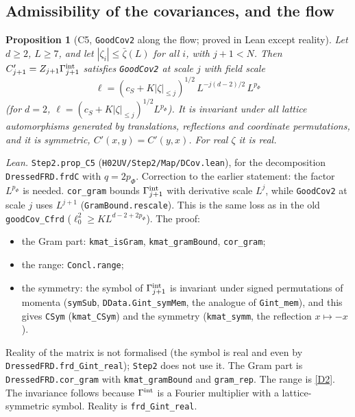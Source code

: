 \documentclass[11pt]{amsart}
\newtheorem{proposition}[theorem]{Proposition}
\theoremstyle{definition}
\theoremstyle{remark}
\numberwithin{equation}{section}
\begin{document}
\subsection{Admissibility of the covariances, and the flow}
\label{sec:coupling-flow}
\begin{proposition}[C5, \texttt{GoodCov2} along the flow; proved in Lean except reality]\label{prop:C5}
Let $d\ge2$, $L\ge7$, and let $|\zeta_i|\le\bar\zeta(L)$ for all $i$, with $j+1<N$. Then
$C'_{j+1}=Z_{j+1}\Gamma^{\rm int}_{j+1}$ satisfies \texttt{GoodCov2} at scale $j$ with field scale
\[
  \ell=(c_S+K|\zeta|_{\le j})^{1/2}\,L^{-j(d-2)/2}\,L^{p_\Phi}
\]
(for $d=2$, $\ell=(c_S+K|\zeta|_{\le j})^{1/2}L^{p_\Phi}$). It is invariant under all lattice
automorphisms generated by translations, reflections and coordinate permutations, and it is
symmetric, $C'(x,y)=C'(y,x)$. For real $\zeta$ it is real.
\end{proposition}
\noindent\emph{Lean.} \texttt{Step2.prop\_C5} (\texttt{H02UV/Step2/Map/DCov.lean}), for the decomposition
\texttt{DressedFRD.frdC} with $q=2p_\Phi$. Correction to the earlier statement: the factor
$L^{p_\Phi}$ is needed. \texttt{cor\_gram} bounds $\Gamma^{\rm int}_{j+1}$ with derivative scale
$L^j$, while \texttt{GoodCov2} at scale $j$ uses $L^{j+1}$ (\texttt{GramBound.rescale}). This is the
same loss as in the old \texttt{goodCov\_Cfrd} ($\ell_0^2\ge KL^{d-2+2p_\Phi}$). The proof:
\begin{itemize}
\item the Gram part: \texttt{kmat\_isGram}, \texttt{kmat\_gramBound}, \texttt{cor\_gram};
\item the range: \texttt{Concl.range};
\item the symmetry: the symbol of $\Gamma^{\rm int}_{j+1}$ is invariant under signed permutations of
  momenta (\texttt{symSub}, \texttt{DData.Gint\_symMem}, the analogue of \texttt{Gint\_mem}), and
  this gives \texttt{CSym} (\texttt{kmat\_CSym}) and the symmetry (\texttt{kmat\_symm}, the
  reflection $x\mapsto-x$).
\end{itemize}
Reality of the matrix is not formalised (the symbol is real and even by
\texttt{DressedFRD.frd\_Gint\_real}); \texttt{Step2} does not use it.
The Gram part is \texttt{DressedFRD.cor\_gram} with \texttt{kmat\_gramBound} and
\texttt{gram\_rep}. The range is \ref{D2}. The invariance follows because $\Gamma^{\rm int}$ is
a Fourier multiplier with a lattice-symmetric symbol. Reality is \texttt{frd\_Gint\_real}.
\end{document}
